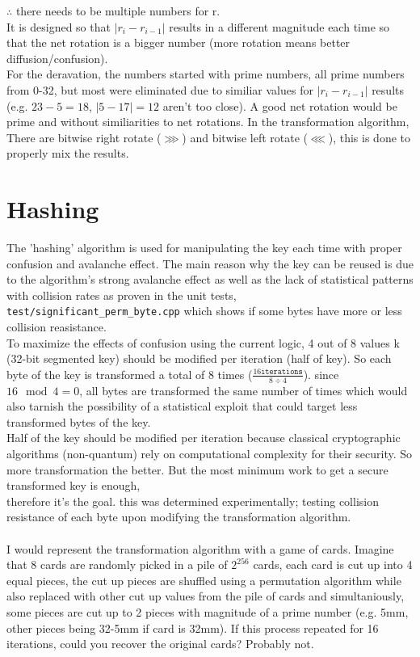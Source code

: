 \documentclass[fleqn, a4paper,12pt]{article}
\begin{document}
$\therefore$ there needs to be multiple numbers for r.
\\
It is designed so that $|r_i - r_{i-1}|$ results in a different magnitude each time so that the net rotation is a bigger number (more rotation means better diffusion/confusion).
\\
For the deravation, the numbers started with prime numbers, all prime numbers from 0-32, but most were eliminated due to similiar values for  $|r_i - r_{i-1}|$ results (e.g. $23-5=18$, $|5-17|=12$ aren't too close). A good net rotation would be prime and without similiarities to net rotations. In the transformation algorithm, There are bitwise right rotate ($\ggg$) and bitwise left rotate ($\lll$), this is done to properly mix the results.

\section{Hashing}

The 'hashing' algorithm is used for manipulating the key each time with proper confusion and avalanche effect. The main reason why the key can be reused is due to the algorithm's strong avalanche effect as well as the lack of statistical patterns with collision rates as proven in the unit tests, \texttt{test/significant\_perm\_byte.cpp} which shows if some bytes have more or less collision reasistance.
\\
To maximize the effects of confusion using the current logic, 4 out of 8 values k (32-bit segmented key) should be modified per iteration (half of key). So each byte of the key is transformed a total of 8 times ($\frac{16 \texttt{iterations}}{8 \div 4}$). since $16 \mod 4 = 0$, all bytes are transformed the same number of times which would also tarnish the possibility of a statistical exploit that could target less transformed bytes of the key.
\\
Half of the key should be modified per iteration because classical cryptographic algorithms (non-quantum) rely on computational complexity for their security. So more transformation the better. But the most minimum work to get a secure transformed key is enough, \\
therefore it's the goal. this was determined experimentally; testing collision resistance of each byte upon modifying the transformation algorithm. \\
\\

I would represent the transformation algorithm with a game of cards. Imagine that 8 cards are randomly picked in a pile of $2^{256}$ cards, each card is cut up into 4 equal pieces, the cut up pieces are shuffled using a permutation algorithm while also replaced with other cut up values from the pile of cards and simultaniously, some pieces are cut up to 2 pieces with magnitude of a prime number (e.g. 5mm, other pieces being 32-5mm if card is 32mm). If this process repeated for 16 iterations, could you recover the original cards? Probably not.
\end{document}
